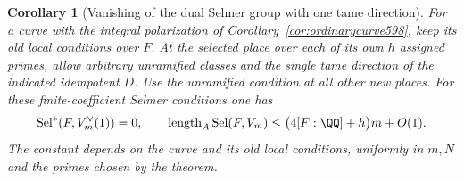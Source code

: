 \documentclass[a4paper,11pt]{article}
\newtheorem{corollary}[proposition]{Corollary}
\theoremstyle{definition}
\theoremstyle{remark}
\numberwithin{equation}{section}
\begin{document}
\begin{corollary}[Vanishing of the dual Selmer group with one tame direction]
\leavevmode\label{cor:rankonedual599}
For a curve with the integral polarization of
Corollary~\ref{cor:ordinarycurve598}, keep its old local
conditions over \(F\). At the selected place over each
of its own \(h\) assigned primes, allow arbitrary
unramified classes and the single tame direction of
the indicated idempotent \(D\). Use the unramified
condition at all other new places. For these
finite-coefficient Selmer conditions one has
\[
  \operatorname{Sel}^{*}(F,V_m^\vee(1))=0,\qquad
  \operatorname{length}_A\operatorname{Sel}(F,V_m)
       \le \bigl(4[F:\QQ]+h\bigr)m+O(1).
\]
The constant depends on the curve and its old local
conditions, uniformly in \(m,N\) and the primes chosen
by the theorem.
\end{corollary}
\end{document}
